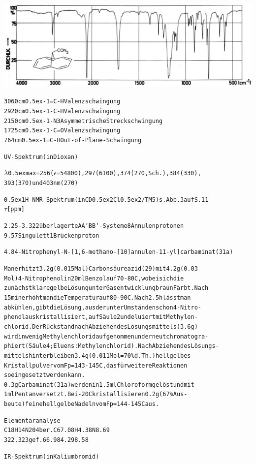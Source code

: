 \documentclass[a4paper,11pt]{article}
\begin{document}
\hspace*{-0.5cm}\includegraphics[width=14.94cm]{IR_034}
\begin{alltt}

3060 cm\raise0.5ex\hbox{-1}   =C-H    Valenzschwingung
2920 cm\raise0.5ex\hbox{-1}   -C-H    Valenzschwingung
2150 cm\raise0.5ex\hbox{-1}   -N3     Asymmetrische Streckschwingung
1725 cm\raise0.5ex\hbox{-1}   -C=O    Valenzschwingung
 764 cm\raise0.5ex\hbox{-1}   =C-H    Out-of-Plane-Schwingung

UV-Spektrum (in Dioxan)

\(\lambda\)\lower0.5ex\hbox{max} = 256 (\(\epsilon\) = 54800), 297 (6100), 374 (270, Sch.), 384 (330),
             393 (370) und 403 nm (270)

\leavevmode\raise0.5ex\hbox{1}H-NMR-Spektrum (in CD\lower0.5ex\hbox{2}Cl\lower0.5ex\hbox{2}/TM5) s. Abb. 3 auf S. 11
  \(\tau\) [ppm]

2.25 - 3.32  2 überlagerte AA‘BB‘-Systeme   8 Annulenprotonen
9.57         Singulett                      1 Brückenproton

\newpage
{}


4.8 4-Nitrophenyl-N-[1,6-methano-[10]annulen-11-yl]carbaminat (31a)

Man erhitzt 3.2 g (0.015 Mal) Carbonsäureazid (29) mit 4.2 g (0.03
Mol) 4-Nitrophenol in 20 ml Benzol auf 70 - 80\degree{}C, wobei sich die
zunächst klare gelbe Lösung unter Gasentwicklung braun Färbt. Nach
15 min erhöht man die Temperatur auf 80 - 90\degree{}C. Nach 2.5 h lässt man
abkühlen, gibt die Lösung, aus der unter Umständen schon 4-Nitro-
phenol auskristallisiert, auf Säule 2 und eluiert mit Methylen-
chlorid. Der Rückstand nach Abziehen des Lösungsmittels (3.6 g)
wird in wenig Methylenchlorid aufgenommen und erneut chromatogra-
phiert (Säule 4; Eluens: Methylenchlorid). Nach Abziehen des Lösungs-
mittels hinterbleiben 3.4 g (0.011 Mol = 70 \% d.Th.) hellgelbes
Kristallpulver vom Fp = 143 - 145\degree{}C, das für weitere Reaktionen
so eingesetzt werden kann.
0.3 g Carbaminat (31a) werden in 1.5 ml Chloroform gelöst und mit
1 ml Pentan versetzt. Bei -20\degree{}C kristallisieren 0.2 g (67 \% Aus-
beute) feine hellgelbe Nadeln vom Fp = 144 - 145\degree{}C aus.

Elementaranalyse
C18H14N204     ber.    C  67.08   H  4.38   N  8.69
 322.323       gef.       66.98      4.29      8.58

IR-Spektrum (in Kaliumbromid)
\end{alltt}
\end{document}
